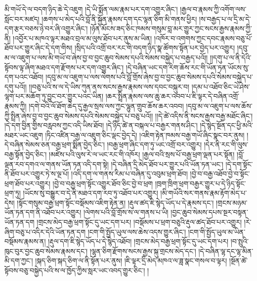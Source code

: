མི་གཡོ་དེ་ལ་བདག་ཉིད་ཆེ་དེ་འཇུག །དེ་ཡི་སྨོན་ལམ་རྣམ་པར་དག་འགྱུར་ཞིང་། །རྒྱལ་བ་རྣམས་ཀྱི་འགོག་ལས་སློང་བར་མཛད། །ཆགས་པ་མེད་པའི་བློ་ནི་སྐྱོན་རྣམས་དག་དང་ལྷན་ཅིག་མི་གནས་ཕྱིར། །ས་བརྒྱད་པ་ལ་དྲི་མ་དེ་དག་རྩར་བཅས་ཉེ་བར་ཞི་འགྱུར་ཞིང་། །ཉོན་མོངས་ཟད་ཅིང་ཁམས་གསུམ་བླ་མར་གྱུར་ཀྱང་སངས་རྒྱས་རྣམས་ཀྱི་ནི། །འབྱོར་པ་མཁའ་ལྟར་མཐའ་བྲལ་མ་ལུས་ཐོབ་པར་ནུས་མ་ཡིན། །འཁོར་བ་འགགས་ཀྱང་དབང་རྣམས་བཅུ་པོ་ཐོབ་པར་གྱུར་ཞིང་དེ་དག་གིས། །སྲིད་པའི་འགྲོ་བར་རང་གི་བདག་ཉིད་སྣ་ཚོགས་སྟོན་པར་བྱེད་པར་འགྱུར། །དབུ་མ་ལ་འཇུག་པ་ལས་མི་གཡོ་བ་ཞེས་བྱ་བ་བྱང་ཆུབ་སེམས་དཔའི་སེམས་བསྐྱེད་པ་བརྒྱད་པའོ།། །།དགུ་པ་ལ་ནི་དེའི་སྟོབས་ལྟ་ཞིག་མཐའ་དག་རྫོགས་པར་དག་འགྱུར་ཞིང་། །དེ་བཞིན་ཡང་དག་རིག་ཆོས་རང་གི་ཡོན་ཏན་ཡོངས་སུ་དག་པའང་འཐོབ། །དབུ་མ་ལ་འཇུག་པ་ལས་ལེགས་པའི་བློ་གྲོས་ཞེས་བྱ་བ་བྱང་ཆུབ་སེམས་དཔའི་སེམས་བསྐྱེད་པ་དགུ་པའོ།། །།བཅུ་པའི་ས་ལ་དེ་ཡིས་ཀུན་ནས་སངས་རྒྱས་རྣམས་ལས་དབང་བསྐུར་བ། །དམ་པ་འཐོབ་ཅིང་ཡེ་ཤེས་ལྷག་པར་མཆོག་ཏུ་བྱུང་བར་གྱུར་པའང་ཡིན། །ཆར་སྤྲིན་རྣམས་ལས་ཆུ་ཆར་འབབ་པ་ཇི་ལྟར་དེ་བཞིན་འགྲོ་རྣམས་ཀྱི། །དགེ་བའི་ལོ་ཐོག་ཆེད་དུ་རྒྱལ་སྲས་ལས་ཀྱང་ལྷུན་གྲུབ་ཆོས་ཆར་འབབ། །དབུ་མ་ལ་འཇུག་པ་ལས་ཆོས་ཀྱི་སྤྲིན་ཞེས་བྱ་བ་བྱང་ཆུབ་སེམས་དཔའི་སེམས་བསྐྱེད་པ་བཅུ་པའོ།། །།དེ་ཚེ་འདིས་ནི་སངས་རྒྱས་བརྒྱ་མཐོང་ཞིང་། །དེ་དག་བྱིན་གྱིས་བརླབས་ཀྱང་འདི་ཡིས་ཐོབ། །དེ་ཉིད་ཚེ་ན་བསྐལ་པ་བརྒྱར་གནས་ཤིང་། །དེ་སྙེད་སྔོན་དང་ཕྱི་མའི་མཐར་ཡང་འཇུག །ཏིང་འཛིན་བརྒྱ་ལ་འཇུག་ཅིང་ལྡང་བྱེད་དེ། །འཇིག་རྟེན་ཁམས་བརྒྱ་གཡོ་ཞིང་སྣང་བར་ནུས། །དེ་བཞིན་སེམས་ཅན་བརྒྱ་ཕྲག་སྨིན་བྱེད་ཅིང་། །བརྒྱ་ཕྲག་ཞིང་དག་ཏུ་ཡང་འགྲོ་བར་འགྱུར། །དེར་ནི་རང་གི་ལུས་བརྒྱ་སྟོན་བྱེད་ཅིང་། །མཛེས་པའི་ལུས་རེ་ལ་ཡང་རང་གི་འཁོར། །རྒྱལ་བའི་སྲས་པོ་བརྒྱ་ཕྲག་ལྡན་པར་སྟོན། །བློ་ལྡན་རབ་དགའ་ལ་གནས་ཡོན་ཏན་འདི་དག་སྟེ། །དེ་བཞིན་དྲི་མེད་ཐོབ་པར་གྱུར་པའི་ཡོན་ཏན་ཡང་། །དེ་དག་སྟོང་ནི་ཐོབ་པར་འགྱུར་ཏེ་ས་ལྔ་པོ། །འདི་དག་ལ་གནས་རིམ་པ་བཞིན་དུ་འབུམ་ཕྲག་ཐོབ། །བྱེ་བ་བརྒྱ་འཐོབ་བྱེ་བ་སྟོང་ཕྲག་ཐོབ་པར་འགྱུར། །བྱེ་བ་བརྒྱ་ཕྲག་སྟོང་འགྱུར་ཐོབ་ཅིང་བྱེ་བ་ཕྲག །ཁྲག་ཁྲིག་ཕྲག་བརྒྱར་གྱུར་པ་དེ་ཉིད་སྟོང་ཕྲག་ཏུ། །ཡོངས་སུ་བསྒྱུར་བ་དེ་ནི་མཐའ་དག་རབ་ཏུ་འཐོབ་པར་འགྱུར། །མི་གཡོའི་སར་གནས་རྣམ་རྟོག་མེད་པ་དེས། །སྟོང་གསུམ་བརྒྱ་ཕྲག་སྟོང་བསྡོམས་འཇིག་རྟེན་ན། །རྡུལ་ཚད་ཇི་སྙེད་ཡོད་པ་དེ་རྣམས་དང་། །གྲངས་མཉམ་ཡོན་ཏན་དག་ནི་འཐོབ་པར་འགྱུར། །ལེགས་པའི་བློ་གྲོས་ས་ལ་གནས་པ་ཡི། །བྱང་ཆུབ་སེམས་དཔས་སྔར་བསྟན་ཡོན་ཏན་དག །གྲངས་མེད་བརྒྱ་ཕྲག་སྟོང་དུ་ཡང་དག་པར། །བསྡོམས་པ་ཕྲག་བཅུའི་རྡུལ་ཚད་ཐོབ་པར་འགྱུར། །རེ་ཞིག་བཅུ་པ་འདིར་དེའི་ཡོན་ཏན་དག །ངག་གི་སྤྱོད་ཡུལ་ལས་ཆེས་འདས་གྱུར་ཞིང་། །ངག་གི་སྤྱོད་ཡུལ་མ་ཡིན་བསྡོམས་རྣམས་ན། །རྡུལ་དག་ཇི་སྙེད་ཡོད་པ་དེ་སྙེད་འཐོབ། །གྲངས་མེད་བརྒྱ་ཕྲག་སྟོང་དུ་ཡང་དག་པར། །བ་སྤུའི་ཁུང་བུར་བྱང་ཆུབ་སེམས་རྣམས་དང་། །ལྷན་ཅིག་རྫོགས་སངས་རྒྱས་སྐུ་གྲངས་མེད་དང་། །དེ་བཞིན་ལྷ་དང་ལྷ་མིན་མི་དག་ཀྱང་། །སྐད་ཅིག་སྐད་ཅིག་ལ་ནི་སྟོན་པར་ནུས། །ཇི་ལྟར་དྲི་མེད་མཁའ་ལ་ཟླ་སྣང་གསལ་བ་ལྟར། །སྔོན་ཚེ་སྟོབས་བཅུ་བསྐྱེད་པའི་ས་ལ་ཁྱོད་ཀྱིས་སླར་ཡང་འབད་གྱུར་ཅིང་། །
